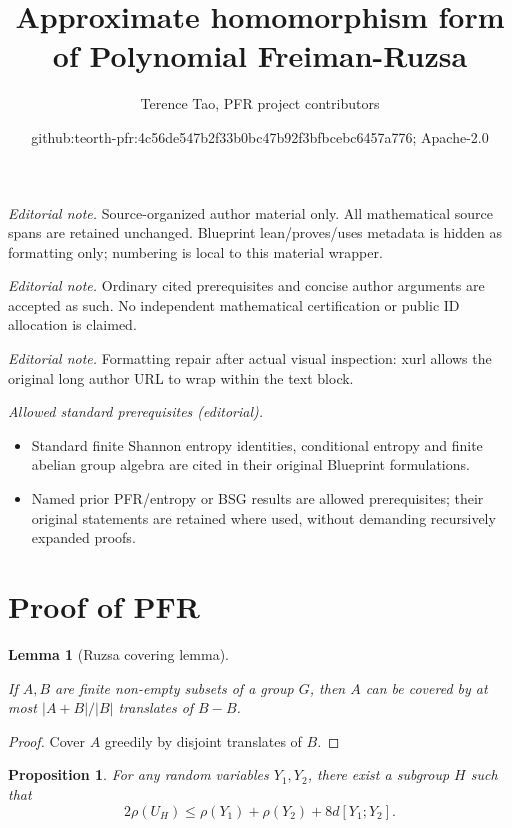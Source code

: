 \documentclass[10pt,a4paper]{article}
\title{Approximate homomorphism form of Polynomial Freiman-Ruzsa}
\author{Terence Tao, PFR project contributors}
\date{github:teorth-pfr:4c56de547b2f33b0bc47b92f3bfbcebc6457a776; Apache-2.0}
\newtheorem{lemma}[theorem]{Lemma}
\newtheorem{proposition}[theorem]{Proposition}
\newcommand{\lean}[1]{}
\newcommand{\leanok}{}
\newcommand{\chapter}[1]{\section{#1}}
\begin{document}
\maketitle
\noindent\textit{Editorial note.} Source-organized author material only. All mathematical source spans are retained unchanged. Blueprint lean/proves/uses metadata is hidden as formatting only; numbering is local to this material wrapper.\par\medskip
\noindent\textit{Editorial note.} Ordinary cited prerequisites and concise author arguments are accepted as such. No independent mathematical certification or public ID allocation is claimed.\par\medskip
\noindent\textit{Editorial note.} Formatting repair after actual visual inspection: xurl allows the original long author URL to wrap within the text block.\par\medskip
\noindent\textit{Allowed standard prerequisites (editorial).}\begin{itemize}
\item Standard finite Shannon entropy identities, conditional entropy and finite abelian group algebra are cited in their original Blueprint formulations.
\item Named prior PFR/entropy or BSG results are allowed prerequisites; their original statements are retained where used, without demanding recursively expanded proofs.
\end{itemize}\medskip
\chapter{Proof of PFR}

\begin{lemma}[Ruzsa covering lemma]
\label{ruz-cov}
\lean{Finset.ruzsa_covering_add}
\leanok
If $A,B$ are finite non-empty subsets of a group $G$, then $A$ can be covered by at most $|A+B|/|B|$ translates of $B-B$.
\end{lemma}
\begin{proof}
\leanok
Cover $A$ greedily by disjoint translates of $B$.
\end{proof}



\begin{proposition} \label{pfr-rho}\lean{rho_PFR_conjecture}\leanok For any random variables $Y_1,Y_2$, there exist a subgroup $H$ such that
  $$ 2\rho(U_H) \leq \rho(Y_1) + \rho(Y_2) + 8 d[Y_1;Y_2].$$
\end{proposition}
\end{document}
